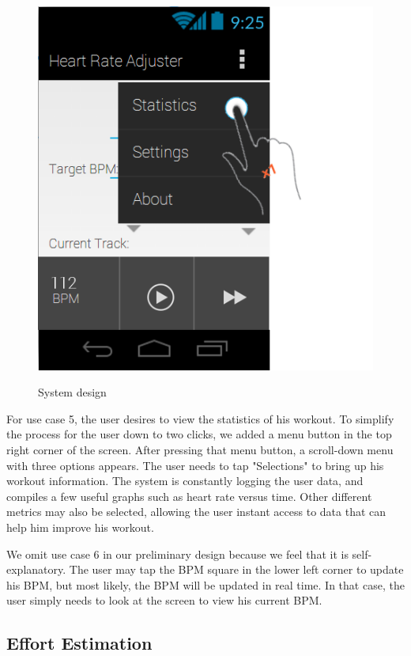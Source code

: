 \documentclass[letterpaper,english, 12pt]{scrreprt}
\begin{document}
\begin{figure}[H]
	\centering
	\includegraphics{img/Prelim_Design/PrelimDesign_4.png}\\
	\caption{System design}
\end{figure}

For use case 5, the user desires to view the statistics of his workout. To simplify the process for the user down to two clicks, we added a menu button in the top right corner of the screen. After pressing that menu button, a scroll-down menu with three options appears. The user needs to tap "Selections" to bring up his workout information. The system is constantly logging the user data, and compiles a few useful graphs such as heart rate versus time. Other different metrics may also be selected, allowing the user instant access to data that can help him improve his workout. 

We omit use case 6 in our preliminary design because we feel that it is self-explanatory. The user may tap the BPM square in the lower left corner to update his BPM, but most likely, the BPM will be updated in real time. In that case, the user simply needs to look at the screen to view his current BPM.

\subsection{Effort Estimation}
\end{document}
